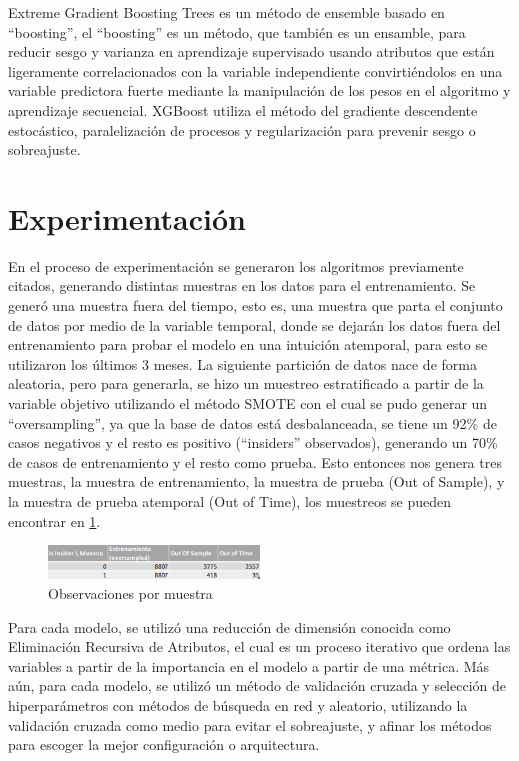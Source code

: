 \documentclass[runningheads]{llncs}
\begin{document}
Extreme Gradient Boosting Trees \cite{chen2016xgboost} es un método de ensemble basado en ``boosting'', el ``boosting'' \cite{breiman1996bias} es un método, que también es un ensamble, para reducir sesgo y varianza en aprendizaje supervisado usando atributos que están ligeramente correlacionados con la variable independiente convirtiéndolos en una variable predictora fuerte mediante la manipulación de los pesos en el algoritmo y aprendizaje secuencial. XGBoost utiliza el método del gradiente descendente estocástico, paralelización de procesos y regularización para prevenir sesgo o sobreajuste. \cite{xgboostintuition}

\section{Experimentación}
\label{sec:experimentacion}

En el proceso de experimentación se generaron los algoritmos previamente citados, generando distintas muestras en los datos para el entrenamiento. Se generó una muestra fuera del tiempo, esto es, una muestra que parta el conjunto de datos por medio de la variable temporal, donde se dejarán los datos fuera del entrenamiento para probar el modelo en una intuición atemporal, para esto se utilizaron los últimos 3 meses. La siguiente partición de datos nace de forma aleatoria, pero para generarla, se hizo un muestreo estratificado a partir de la variable objetivo utilizando el método SMOTE \cite{chawla2002smote} con el cual se pudo generar un ``oversampling'', ya que la base de datos está desbalanceada, se tiene un 92\% de casos negativos y el resto es positivo (``insiders'' observados), generando un 70\% de casos de entrenamiento y el resto como prueba. Esto entonces nos genera tres muestras, la muestra de entrenamiento, la muestra de prueba (Out of Sample), y la muestra de prueba atemporal (Out of Time), los muestreos se pueden encontrar en \ref{fig:muestras}.

\begin{figure}[h]
    \centering
    \includegraphics[width=0.5\textwidth]{imagenes/Muestras.PNG}
    \caption{Observaciones por muestra}
    \label{fig:muestras}
\end{figure}


Para cada modelo, se utilizó una reducción de dimensión conocida como Eliminación Recursiva de Atributos, el cual es un proceso iterativo que ordena las variables a partir de la importancia en el modelo a partir de una métrica. Más aún, para cada modelo, se utilizó un método de validación cruzada y selección de hiperparámetros con métodos de búsqueda en red y aleatorio, utilizando la validación cruzada como medio para evitar el sobreajuste, y afinar los métodos para escoger la mejor configuración o arquitectura.
\end{document}
